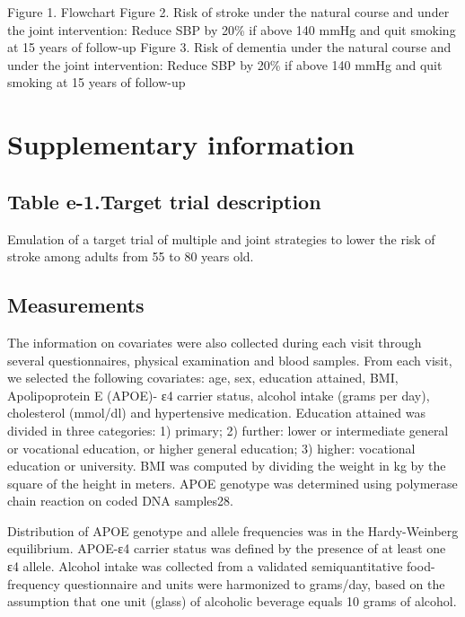 \documentclass[
]{book}
\begin{document}
Figure 1. Flowchart
Figure 2. Risk of stroke under the natural course and under the joint intervention: Reduce SBP by 20\% if above 140 mmHg and quit smoking at 15 years of follow-up
Figure 3. Risk of dementia under the natural course and under the joint intervention: Reduce SBP by 20\% if above 140 mmHg and quit smoking at 15 years of follow-up

\hypertarget{supplementary-information-1}{%
\section{Supplementary information}\label{supplementary-information-1}}

\hypertarget{table-e-1.target-trial-description}{%
\subsection{Table e-1.Target trial description}\label{table-e-1.target-trial-description}}

Emulation of a target trial of multiple and joint strategies to lower the risk of stroke among adults from 55 to 80 years old.

\newpage

\hypertarget{measurements}{%
\subsection{Measurements}\label{measurements}}

The information on covariates were also collected during each visit through several questionnaires, physical examination and blood samples. From each visit, we selected the following covariates: age, sex, education attained, BMI, Apolipoprotein E (APOE)- ε4 carrier status, alcohol intake (grams per day), cholesterol (mmol/dl) and hypertensive medication. Education attained was divided in three categories: 1) primary; 2) further: lower or intermediate general or vocational education, or higher general education; 3) higher: vocational education or university\autocite{ott2002}. BMI was computed by dividing the weight in kg by the square of the height in meters. APOE genotype was determined using polymerase chain reaction on coded DNA samples28.

Distribution of APOE genotype and allele frequencies was in the Hardy-Weinberg equilibrium. APOE-ε4 carrier status was defined by the presence of at least one ε4 allele. Alcohol intake was collected from a validated semiquantitative food-frequency questionnaire and units were harmonized to grams/day, based on the assumption that one unit (glass) of alcoholic beverage equals 10 grams of alcohol\autocite{ruitenberg2002}.
\end{document}
